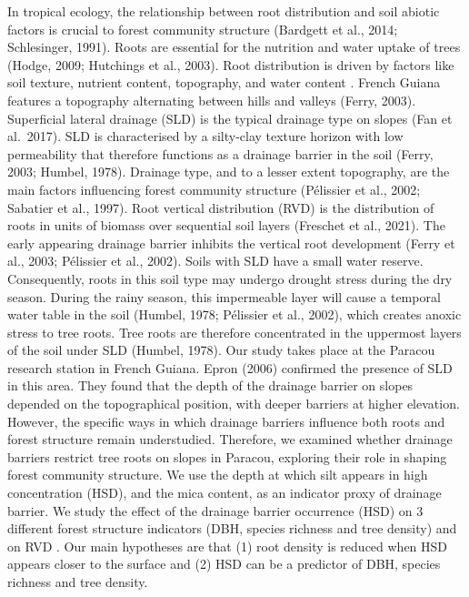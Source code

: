 \documentclass[fleqn,12pt]{latex/stylish_article} %
\begin{document}
In tropical ecology, the relationship between root distribution and soil abiotic factors is crucial to forest community structure (Bardgett et al., 2014; Schlesinger, 1991). Roots are essential for the nutrition and water uptake of trees (Hodge, 2009; Hutchings et al., 2003). Root distribution is driven by factors like soil texture, nutrient content, topography, and water content \citep{freschetStartingGuideRoot2021}.
French Guiana features a topography alternating between hills and valleys (Ferry, 2003). Superficial lateral drainage (SLD) is the typical drainage type on slopes (Fan et al.~2017). SLD is characterised by a silty-clay texture horizon with low permeability that therefore functions as a drainage barrier in the soil (Ferry, 2003; Humbel, 1978). Drainage type, and to a lesser extent topography, are the main factors influencing forest community structure (Pélissier et al., 2002; Sabatier et al., 1997).
Root vertical distribution (RVD) is the distribution of roots in units of biomass over sequential soil layers (Freschet et al., 2021). The early appearing drainage barrier inhibits the vertical root development (Ferry et al., 2003; Pélissier et al., 2002). Soils with SLD have a small water reserve. Consequently, roots in this soil type may undergo drought stress during the dry season. During the rainy season, this impermeable layer will cause a temporal water table in the soil (Humbel, 1978; Pélissier et al., 2002), which creates anoxic stress to tree roots. Tree roots are therefore concentrated in the uppermost layers of the soil under SLD (Humbel, 1978).
Our study takes place at the Paracou research station in French Guiana. Epron (2006) confirmed the presence of SLD in this area. They found that the depth of the drainage barrier on slopes depended on the topographical position, with deeper barriers at higher elevation. However, the specific ways in which drainage barriers influence both roots and forest structure remain understudied. Therefore, we examined whether drainage barriers restrict tree roots on slopes in Paracou, exploring their role in shaping forest community structure. We use the depth at which silt appears in high concentration (HSD), and the mica content, as an indicator proxy of drainage barrier. We study the effect of the drainage barrier occurrence (HSD) on 3 different forest structure indicators (DBH, species richness and tree density) and on RVD . Our main hypotheses are that (1) root density is reduced when HSD appears closer to the surface and (2) HSD can be a predictor of DBH, species richness and tree density.
\end{document}
